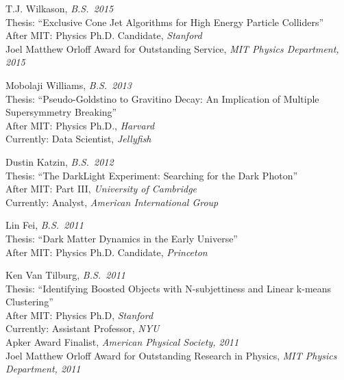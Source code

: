 \item T.J. Wilkason, \emph{B.S.~2015}
\\ Thesis: ``Exclusive Cone Jet Algorithms for High Energy Particle Colliders''
\\ After MIT: Physics Ph.D. Candidate, \emph{Stanford}
\\ Joel Matthew Orloff Award for Outstanding Service, \emph{MIT Physics Department, 2015}

\item Mobolaji Williams, \emph{B.S.~2013}
\\ Thesis: ``Pseudo-Goldstino to Gravitino Decay: An Implication of Multiple Supersymmetry Breaking''
\\ After MIT: Physics Ph.D., \emph{Harvard}
\\ Currently: Data Scientist, \emph{Jellyfish}

\item Dustin Katzin, \emph{B.S.~2012}
\\ Thesis: ``The DarkLight Experiment: Searching for the Dark Photon''
\\ After MIT: Part III, \emph{University of Cambridge}
\\ Currently: Analyst, \emph{American International Group}

\item Lin Fei, \emph{B.S.~2011}
\\ Thesis: ``Dark Matter Dynamics in the Early Universe''
\\ After MIT: Physics Ph.D. Candidate, \emph{Princeton}

\item Ken Van Tilburg, \emph{B.S.~2011}
\\ Thesis: ``Identifying Boosted Objects with N-subjettiness and Linear k-means Clustering''
\\ After MIT: Physics Ph.D, \emph{Stanford}
\\ Currently: Assistant Professor, \emph{NYU}
\\ Apker Award Finalist, \emph{American Physical Society, 2011}
\\ Joel Matthew Orloff Award for Outstanding Research in Physics, \emph{MIT Physics Department, 2011}

\el

